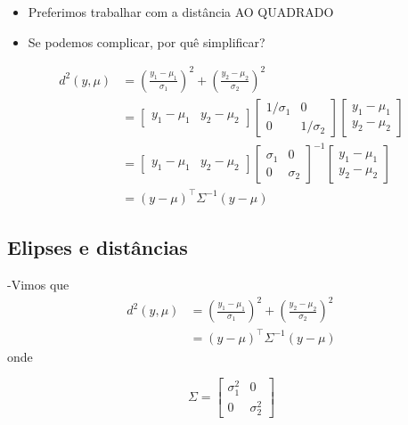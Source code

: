 \documentclass[
  letterpaper,
  DIV=11,
  numbers=noendperiod]{scrartcl}
\providecommand{\tightlist}{%
  \setlength{\itemsep}{0pt}\setlength{\parskip}{0pt}}\usepackage{longtable,booktabs,array}
\begin{document}
\begin{itemize}
\tightlist
\item
  Preferimos trabalhar com a distância AO QUADRADO
\item
  Se podemos complicar, por quê simplificar?
\end{itemize}

\begin{align}
d^2(y,\mu) &= \left(\frac{y_1-\mu_1}{\sigma_1}\right)^2 + \left(\frac{y_2-\mu_2}{\sigma_2}\right)^2 \\
&= \begin{bmatrix}y_1 - \mu_1& y_2- \mu_2\end{bmatrix} \begin{bmatrix}1/\sigma_1 & 0 \\ 0 & 1/\sigma_2\end{bmatrix}\begin{bmatrix}y_1 - \mu_1 \\ y_2 - \mu_2\end{bmatrix}\\
&= \begin{bmatrix}y_1 - \mu_1& y_2- \mu_2\end{bmatrix} \begin{bmatrix}\sigma_1 & 0 \\ 0 & \sigma_2\end{bmatrix}^{-1}\begin{bmatrix}y_1 - \mu_1 \\ y_2 - \mu_2\end{bmatrix}\\
&= (y-\mu)^\top \Sigma^{-1}(y-\mu)

\end{align}

\hypertarget{elipses-e-distuxe2ncias}{%
\subsection{Elipses e distâncias}\label{elipses-e-distuxe2ncias}}

-Vimos que \begin{align}
d^2(y,\mu) &= \left(\frac{y_1-\mu_1}{\sigma_1}\right)^2 + \left(\frac{y_2-\mu_2}{\sigma_2}\right)^2 \\
&= (y-\mu)^\top \Sigma^{-1}(y-\mu)
\end{align} onde

\[ \Sigma = \begin{bmatrix} \sigma_1^2 & 0 \\ 0 & \sigma_2^2\end{bmatrix}\]
\end{document}
